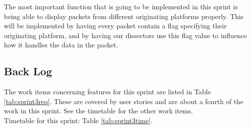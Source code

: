 The most important function that is going to be implemented in this sprint is being able to display \glspl{packet} from different originating platforms properly. This will be implemented by having every \gls{packet} contain a flag specifying their originating platform, and by having our \glspl{dissector} use this flag value to influence how it handles the data in the \gls{packet}.

\subsection{Back Log}
The work items concerning features for this sprint are listed in Table \ref{tab:sprint3req}. These are covered by user stories and are about a fourth of the work in this sprint. See the timetable for the other work items.\\
Timetable for this sprint: Table \ref{tab:sprint3time}. \\

